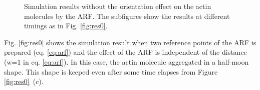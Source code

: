 \documentclass[a4paper,12pt, oneside]{book}
\begin{document}
\begin{figure}[tbp]
 \caption{Simulation results without the orientation effect on the actin molecules by the ARF. The subfigures show the results at different timings as in Fig. \ref{fig:res0}.}
 \label{fig:res4}
\end{figure}

Fig. \ref{fig:res0} shows the simulation result when two reference points of the ARF is prepared (eq. \ref{eq:arf}) and the effect of the ARF is independent of the distance (w=1 in eq. \ref{eq:arf}).
In this case, the actin molecule aggregated in a half-moon shape.
This shape is keeped even after some time elapses from Figure \ref{fig:res0}~(c).
\end{document}
